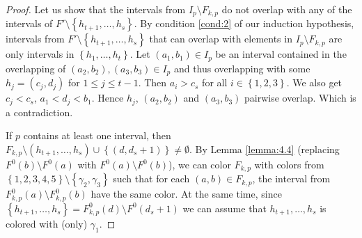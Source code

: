 \documentclass{article}
\theoremstyle{definition}
\begin{document}
\begin{proof}
        Let us show that the 
        intervals from $I_{p}
        \setminus F_{k, p}$ do 
        not overlap with 
        any of the intervals of
        $F' \setminus \left\{
        h_{t+1},\ldots,h_{s}\right\}$.
        By condition \ref{cond:2}
        of our induction hypothesis, 
        intervals from
        $F' \setminus \left\{h_{t+1},
        \ldots, h_{s}\right\}$
        that can overlap with 
        elements in $I_{p} \setminus 
        F_{k,p}$ are only intervals
        in $\left\{h_1, \ldots, h_{t}\right\}$.
        Let $\left(a_1, b_1\right) \in I_{p}$ 
        be an interval contained in the
        overlapping of
        $\left(a_2, b_2\right), 
        \left(a_3, b_3\right)
        \in I_{p}$ and thus
        overlapping with some
        $h_{j} =\left(c_{j}, d_{j}\right)$ 
        for $1 \leq j \leq t-1$.
        Then $a_{i} > c_{s}$ for
        all $i \in \left\{1, 2, 3\right\}$.
        We also get $c_{j} < c_{s}$,
        $a_1 < d_{j} < b_1$. Hence
        $h_{j}$, $\left(a_2, b_2\right)$ 
        and $\left(a_3, b_3\right)$ 
        pairwise overlap.
        Which is a contradiction.

        If $p$ contains at least one interval,
        then $F_{k, p} \setminus \left(h_{t+1},
        \ldots, h_{s}\right) \cup 
        \left\{\left(d, d_{s} + 1\right)\right\}
        \neq \emptyset$.
        By Lemma \ref{lemma:4.4}
        (replacing $F^{0}\left(b\right)
        \setminus F^{0}\left(a\right)$
        with $F^{0}\left(a\right)
        \setminus F^{0}\left(b\right)$),
        we can color $F_{k, p}$ 
        with colors from
        $\left\{1,2,3,4,5\right\} \setminus 
        \left\{\gamma_2, \gamma_3\right\}$
        such that
        for each
        $\left(a, b\right) \in 
        F_{k, p}$,
        the interval from
        $F^{0}_{k, p}\left(a\right) \setminus 
        F^{0}_{k, p}\left(b\right)$
        have the same color.
        At the same time,
        since $\left\{h_{t+1},
        \ldots, h_{s}\right\}
        = F^{0}_{k, p}\left(d\right)
        \setminus F^{0}\left(d_{s} + 1\right)$
        \reversemarginpar
        \reversemarginpar
        we can assume that 
        $h_{t+1}, \ldots,
        h_{s}$ is colored 
        with (only) $\gamma_1$.
        

\end{proof}
\end{document}

